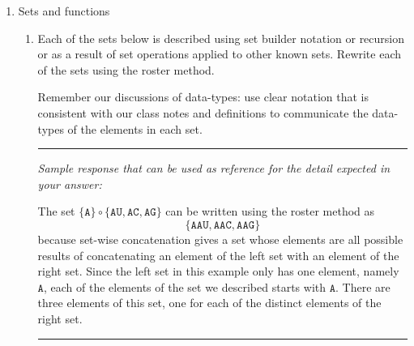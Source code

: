 \documentclass[12pt, oneside]{article}
\newcommand{\A}[0]{\texttt{A}}
\newcommand{\C}[0]{\texttt{C}}
\newcommand{\G}[0]{\texttt{G}}
\newcommand{\U}[0]{\texttt{U}}
\begin{document}
\begin{enumerate}[labelindent=0pt, leftmargin=0pt]
\begin{enumerate}[labelindent=0pt, leftmargin=0pt]
        Can you find two different $3$-tuples that represent colors that are indistinguishable to your eye? You can use the website in the footnote to play around
        with different choices of red, green, and blue levels to see if you can distinguish between the resulting colors.
        Why or why not? 

        A complete answer will include the specific example $3$-tuples that work, along with a description of the colors that they represent and why they
        are indistinguishable, or an explanation of why there can't be such an example.
    \end{enumerate}

    \item Sets and functions
    \begin{enumerate}
        \item Each of the sets below is described 
using set builder notation or recursion or as a result of set operations
applied to other known sets.  Rewrite each of the sets using the roster method.

Remember our discussions of data-types: use clear notation that 
is consistent with our class notes and definitions 
to communicate the data-types of the elements in each set.


\rule{0.5\textwidth}{.4pt}

{\it Sample response that can be used as reference for the detail expected 
in your answer:} 

The set $\{ \A \} \circ \{ \A\U, \A\C, \A\G\}$ can be written using
the roster method as 
\[
\{ \A\A\U, \A\A\C, \A\A\G \}
\]
because set-wise concatenation gives a set whose elements are 
all possible results of concatenating an element of the 
left set with an 
element of the right set. Since the left set in this example only
has one element, namely $\A$, each of the elements of the set we 
described starts with $\A$. There are three elements of this set, 
one for each of the distinct elements of the right set.

\rule{0.5\textwidth}{.4pt}


\end{enumerate}
\end{enumerate}
\end{document}
